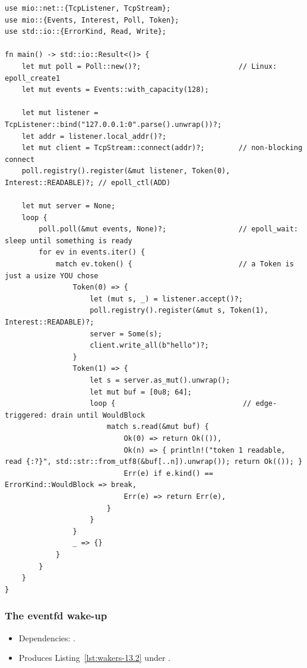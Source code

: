 \begin{lstlisting}[caption={A listener and a client using mio directly, with no async code.}, label=lst:wakers-A.1]
use mio::net::{TcpListener, TcpStream};
use mio::{Events, Interest, Poll, Token};
use std::io::{ErrorKind, Read, Write};

fn main() -> std::io::Result<()> {
    let mut poll = Poll::new()?;                       // Linux: epoll_create1
    let mut events = Events::with_capacity(128);

    let mut listener = TcpListener::bind("127.0.0.1:0".parse().unwrap())?;
    let addr = listener.local_addr()?;
    let mut client = TcpStream::connect(addr)?;        // non-blocking connect
    poll.registry().register(&mut listener, Token(0), Interest::READABLE)?; // epoll_ctl(ADD)

    let mut server = None;
    loop {
        poll.poll(&mut events, None)?;                 // epoll_wait: sleep until something is ready
        for ev in events.iter() {
            match ev.token() {                         // a Token is just a usize YOU chose
                Token(0) => {
                    let (mut s, _) = listener.accept()?;
                    poll.registry().register(&mut s, Token(1), Interest::READABLE)?;
                    server = Some(s);
                    client.write_all(b"hello")?;
                }
                Token(1) => {
                    let s = server.as_mut().unwrap();
                    let mut buf = [0u8; 64];
                    loop {                              // edge-triggered: drain until WouldBlock
                        match s.read(&mut buf) {
                            Ok(0) => return Ok(()),
                            Ok(n) => { println!("token 1 readable, read {:?}", std::str::from_utf8(&buf[..n]).unwrap()); return Ok(()); }
                            Err(e) if e.kind() == ErrorKind::WouldBlock => break,
                            Err(e) => return Err(e),
                        }
                    }
                }
                _ => {}
            }
        }
    }
}
\end{lstlisting}

\subsubsection{The eventfd wake-up}

\begin{itemize}
    \item Dependencies: .
    \item Produces Listing~\ref{lst:wakers-13.2} under .
\end{itemize}

